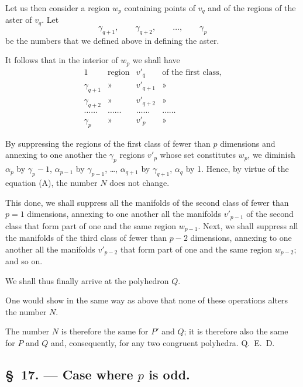 \documentclass{article}
\begin{document}
Let us then consider a region $w_{p}$ containing points of $v_{q}$ and of the regions of the aster of $v_{q}$. Let
\[ \gamma_{q+1}, \qquad \gamma_{q+2}, \qquad \ldots, \qquad \gamma_{p} \]
be the numbers that we defined above in defining the aster.

It follows that in the interior of $w_{p}$ we shall have
\[ \begin{matrix} 1 & \text{region} & v'_{q} & \text{of the first class,} \\[1ex] \gamma_{q+1} & \text{»} & v'_{q+1} & \text{»} \\[1ex] \gamma_{q+2} & \text{»} & v'_{q+2} & \text{»} \\[1ex] \ldots\ldots & \ldots\ldots & \ldots\ldots & \ldots\ldots \\[1ex] \gamma_{p} & \text{»} & v'_{p} & \text{»} \end{matrix} \]

By suppressing the regions of the first class of fewer than $p$ dimensions and annexing to one another the $\gamma_{p}$ regions $v'_{p}$ whose set constitutes $w_{p}$, we diminish $\alpha_{p}$ by $\gamma_{p} - 1$, $\alpha_{p-1}$ by $\gamma_{p-1}$, \ldots, $\alpha_{q+1}$ by $\gamma_{q+1}$, $\alpha_{q}$ by 1. Hence, by virtue of the equation (A), the number $N$ does not change.

This done, we shall suppress all the manifolds of the second class of fewer than $p = 1$ dimensions, annexing to one another all the manifolds $v'_{p-1}$ of the second class that form part of one and the same region $w_{p-1}$. Next, we shall suppress all the manifolds of the third class of fewer than $p - 2$ dimensions, annexing to one another all the manifolds $v'_{p-2}$ that form part of one and the same region $w_{p-2}$; and so on.

We shall thus finally arrive at the polyhedron $Q$.

One would show in the same way as above that none of these operations alters the number $N$.

The number $N$ is therefore the same for $P'$ and $Q$; it is therefore also the same
for $P$ and $Q$ and, consequently, for any two congruent polyhedra. Q.~E.~D.

\subsection*{\S~17. --- Case where $p$ is odd.}
\end{document}
